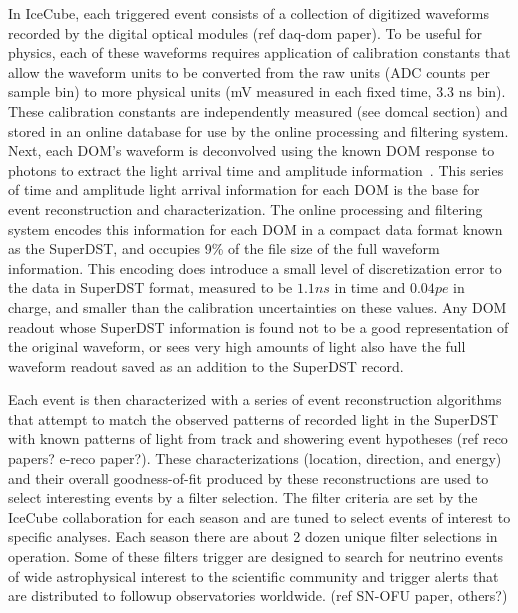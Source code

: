 In IceCube, each triggered event consists of a collection of digitized waveforms recorded by the digital optical modules (ref daq-dom paper).
To be useful for physics, each of these waveforms requires application of calibration constants that allow the waveform units
to be converted from the raw units (ADC counts per sample bin) to more physical units (mV measured in each fixed time, 3.3 ns bin).  These
calibration constants are independently measured (see domcal section) and stored in an online database for use by
the online processing and filtering system.  Next, each DOM's waveform is deconvolved using the known DOM response
to photons to extract the light arrival time and amplitude information~\cite{IC3:ereco}.  
This series of time and amplitude light arrival information
for each DOM is the base for event reconstruction and characterization.  The online processing and filtering system encodes
this information for each DOM in a compact data format known as the SuperDST, and occupies 9\%  of the file size
of the full waveform information.  This encoding does introduce a small level of discretization error to the
data in SuperDST format, measured to be $1.1ns$ in time and $0.04pe$ in charge, and smaller than the calibration
uncertainties on these values.  Any DOM readout whose SuperDST information is found not to be a good representation of the
original waveform, or sees very high amounts of light also have the full waveform readout saved as an addition to the SuperDST record.


Each event is then characterized with a series of event reconstruction algorithms that attempt to match
the observed patterns of recorded light in the SuperDST with known patterns of light
from track and showering event hypotheses (ref reco papers?  e-reco paper?).  These characterizations (location, direction, and energy) and their
overall goodness-of-fit produced by these reconstructions are used to select interesting
events by a filter selection.  The filter criteria are set by the IceCube collaboration for each season
and are tuned to select events of interest to specific analyses.  Each season there are
about 2 dozen unique filter selections in operation.  Some of these filters trigger are
designed to search for neutrino events of wide astrophysical interest to the scientific community and trigger
alerts that are distributed to followup observatories worldwide. (ref SN-OFU paper, others?)

